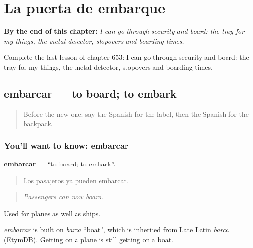 
\chapter{La puerta de embarque}
\label{ch:es-la-puerta-de-embarque}

\begin{chapteropening}
\textbf{By the end of this chapter:} \emph{I can go through security and board: the tray for my things, the metal detector, stopovers and boarding times.}

Complete the last lesson of chapter 653: I can go through security and board: the tray for my things, the metal detector, stopovers and boarding times.
\end{chapteropening}

\section[embarcar]{embarcar — to board; to embark}

\label{lesson:ES-C653-embarcar}



\begin{quote}
Before the new one: say the Spanish for the label, then the Spanish for the backpack.
\end{quote}

\subsection*{You'll want to know: embarcar}
\textbf{embarcar} — \textquotedblleft{}to board; to embark\textquotedblright{}.

\begin{quote}
Los pasajeros ya pueden embarcar.
\end{quote}

\begin{quote}
\emph{Passengers can now board.}
\end{quote}

Used for planes as well as ships.

\begin{cousinweb}
\emph{embarcar} is built on \emph{barca} \textquotedblleft{}boat\textquotedblright{}, which is inherited from Late Latin \emph{barca} (EtymDB). Getting on a plane is still getting on a boat.
\end{cousinweb}

